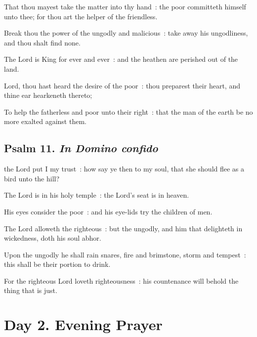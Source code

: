 That thou mayest take the matter into thy hand~: the poor committeth himself unto thee; for thou art the helper of the friendless.\par
{}Break thou the power of the ungodly and malicious~: take away his ungodliness, and thou shalt find none.\par
{}The Lord is King for ever and ever~: and the heathen are perished out of the land.\par
{}Lord, thou hast heard the desire of the poor~: thou preparest their heart, and thine ear hearkeneth thereto;\par
{}To help the fatherless and poor unto their right~: that the man of the earth be no more exalted against them.\par

\clearpage
\subsection{Psalm 11. \textit{In Domino confido}}

 the Lord put I my trust~: how say ye then to my soul, that she should flee as a bird unto the hill?\par
{}
The Lord is in his holy temple~: the Lord's seat is in heaven.\par
{}His eyes consider the poor~: and his eye-lids try the children of men.\par
{}The Lord alloweth the righteous~: but the ungodly, and him that delighteth in wickedness, doth his soul abhor.\par
{}Upon the ungodly he shall rain snares, fire and brimstone, storm and tempest~: this shall be their portion to drink.\par
{}For the righteous Lord loveth righteousness~: his countenance will behold the thing that is just.\par

\section*{Day 2. Evening Prayer}

